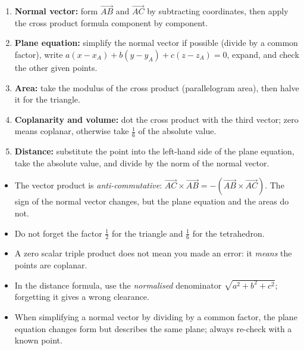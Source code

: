 \documentclass[11pt]{article}
\newcounter{popsec}
\newcounter{popsub}
\newcommand{\courssub}[1]{%
  \stepcounter{popsub}%
  \par\vspace{9pt}\noindent{\popxbold\fontsize{11.5}{13}\selectfont\color{popink}{\color{poporange}\thepopsec.\thepopsub}\hspace{6pt}#1}\par\nopagebreak\vspace{4pt}
}
\begin{document}
\begin{methode}
\begin{enumerate}
\item \textbf{Normal vector:} form $\vec{AB}$ and $\vec{AC}$ by subtracting coordinates, then apply the cross product formula component by component.
\item \textbf{Plane equation:} simplify the normal vector if possible (divide by a common factor), write $a(x-x_A)+b(y-y_A)+c(z-z_A)=0$, expand, and check the other given points.
\item \textbf{Area:} take the modulus of the cross product (parallelogram area), then halve it for the triangle.
\item \textbf{Coplanarity and volume:} dot the cross product with the third vector; zero means coplanar, otherwise take $\tfrac16$ of the absolute value.
\item \textbf{Distance:} substitute the point into the left-hand side of the plane equation, take the absolute value, and divide by the norm of the normal vector.
\end{enumerate}
\end{methode}

\begin{attention}
\begin{itemize}
\item The vector product is \emph{anti-commutative}: $\vec{AC}\times\vec{AB}=-(\vec{AB}\times\vec{AC})$. The sign of the normal vector changes, but the plane equation and the areas do not.
\item Do not forget the factor $\tfrac12$ for the triangle and $\tfrac16$ for the tetrahedron.
\item A zero scalar triple product does not mean you made an error: it \emph{means} the points are coplanar.
\item In the distance formula, use the \emph{normalised} denominator $\sqrt{a^2+b^2+c^2}$; forgetting it gives a wrong clearance.
\item When simplifying a normal vector by dividing by a common factor, the plane equation changes form but describes the same plane; always re-check with a known point.
\end{itemize}
\end{attention}

\courssub{Model answer}
\end{document}
